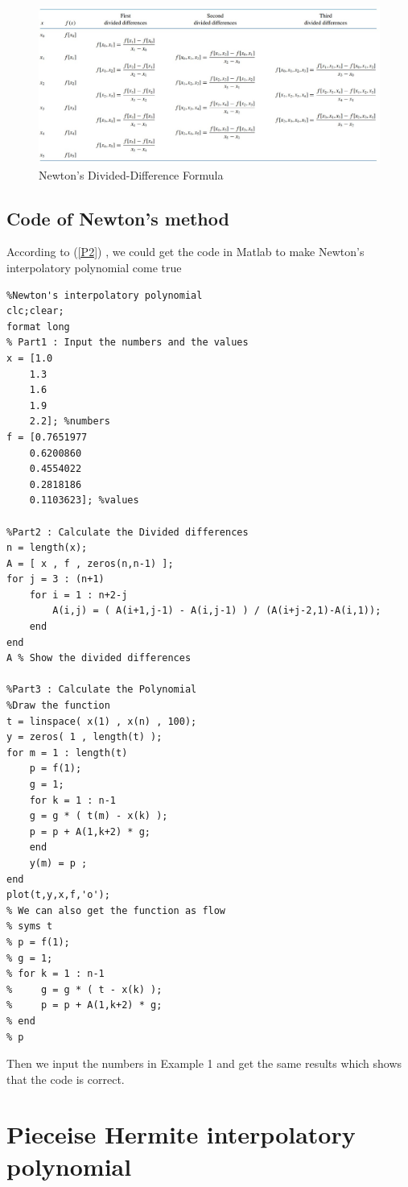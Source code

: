 \documentclass{article}
\begin{document}
\begin{figure}[h!]
\centering
\includegraphics[width=1\textwidth]{newton1.JPG}
\caption{Newton’s Divided-Difference Formula}
\label{newton1}
\end{figure}

\newpage
\subsection{Code of Newton's method}

According to (\ref{P2}) , we could get the code in Matlab to make Newton’s interpolatory polynomial come true

\begin{lstlisting}
%Newton's interpolatory polynomial
clc;clear;
format long
% Part1 : Input the numbers and the values
x = [1.0
    1.3
    1.6
    1.9
    2.2]; %numbers
f = [0.7651977
    0.6200860
    0.4554022
    0.2818186
    0.1103623]; %values

%Part2 : Calculate the Divided differences
n = length(x);
A = [ x , f , zeros(n,n-1) ];
for j = 3 : (n+1)
    for i = 1 : n+2-j
        A(i,j) = ( A(i+1,j-1) - A(i,j-1) ) / (A(i+j-2,1)-A(i,1));
    end
end
A % Show the divided differences

%Part3 : Calculate the Polynomial
%Draw the function
t = linspace( x(1) , x(n) , 100);
y = zeros( 1 , length(t) );
for m = 1 : length(t)
    p = f(1);
    g = 1;
    for k = 1 : n-1
    g = g * ( t(m) - x(k) );
    p = p + A(1,k+2) * g;
    end
    y(m) = p ;
end
plot(t,y,x,f,'o');
% We can also get the function as flow
% syms t
% p = f(1);
% g = 1;
% for k = 1 : n-1
%     g = g * ( t - x(k) );
%     p = p + A(1,k+2) * g;
% end
% p
\end{lstlisting}

Then we input the numbers in Example 1 and get the same results which shows that the code is correct.


\section{Pieceise Hermite interpolatory polynomial}
\end{document}
